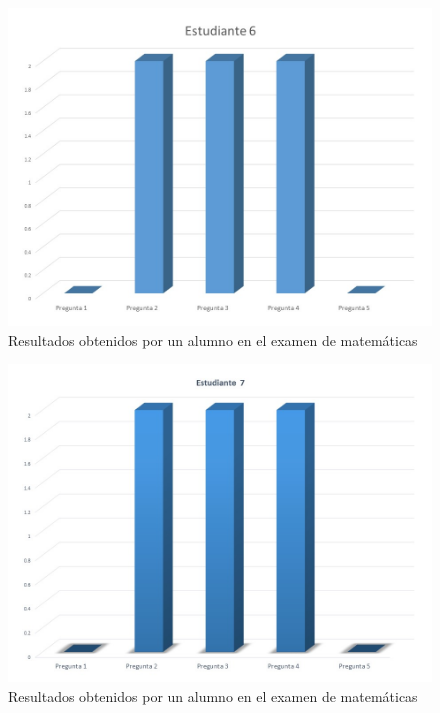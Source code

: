 \documentclass[12pt] {report}
\begin{document}
\begin{figure}[H]
\centering 
\includegraphics[scale=.4]{MEstudiante6.JPG}
\caption{Resultados obtenidos por un alumno en el examen de matemáticas}
\end{figure}
\begin{figure}[H]
\centering 
\includegraphics[scale=.4]{MEstudiante7.JPG}
\caption{Resultados obtenidos por un alumno en el examen de matemáticas}
\end{figure}
\end{document}
